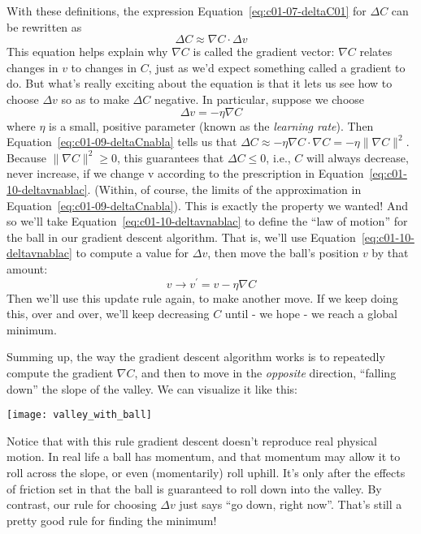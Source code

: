 With these definitions, the expression Equation~\ref{eq:c01-07-deltaC01} for $\Delta C$ can be rewritten as 
\begin{equation}
\Delta C \approx \nabla C \cdot \Delta v
\label{eq:c01-09-deltaCnabla}
\end{equation}
This equation helps explain why $\nabla C$ is called the gradient vector: $\nabla C$ relates changes in $v$ to changes in $C$, just as we'd expect something called a gradient to do. But what's really exciting about the equation is that it lets us see how to choose $\Delta v$ so as to make $\Delta C$ negative. In particular, suppose we choose 
\begin{equation}
\Delta v=-\eta \nabla C
\label{eq:c01-10-deltavnablac}
\end{equation}
where $\eta$ is a small, positive parameter (known as the \textit{learning rate}). Then Equation~\ref{eq:c01-09-deltaCnabla} tells us that $\Delta C \approx-\eta \nabla C \cdot \nabla C=-\eta\parallel\nabla C\parallel^{2}$. Because $\parallel\nabla C\parallel^{2} \geq 0$, this guarantees that $\Delta C\leq 0$, i.e., $C$ will always decrease, never increase, if we change v according to the prescription in Equation~\ref{eq:c01-10-deltavnablac}. (Within, of course, the limits of the approximation in Equation~\ref{eq:c01-09-deltaCnabla}). This is exactly the property we wanted! And so we'll take Equation~\ref{eq:c01-10-deltavnablac} to define the ``law of motion'' for the ball in our gradient descent algorithm. That is, we'll use Equation~\ref{eq:c01-10-deltavnablac} to compute a value for $\Delta v$, then move the ball's position $v$ by that amount: 
\begin{equation}
v \rightarrow v^{\prime}=v-\eta \nabla C
\end{equation}
Then we'll use this update rule again, to make another move. If we keep doing this, over and over, we'll keep decreasing $C$ until - we hope - we reach a global minimum.

Summing up, the way \label{page:valleywihball} the gradient descent algorithm works is to repeatedly compute the gradient $\nabla C$, and then to move in the \textit{opposite} direction, ``falling down'' the slope of the valley. We can visualize it like this:

\begin{marginfigure}
\texttt{[image: valley\_with\_ball]}
\end{marginfigure}

Notice that with this rule gradient descent doesn't reproduce real physical motion. In real life a ball has momentum, and that momentum may allow it to roll across the slope, or even (momentarily) roll uphill. It's only after the effects of friction set in that the ball is guaranteed to roll down into the valley. By contrast, our rule for choosing $\Delta v$ just says ``go down, right now''. That's still a pretty good rule for finding the minimum!

